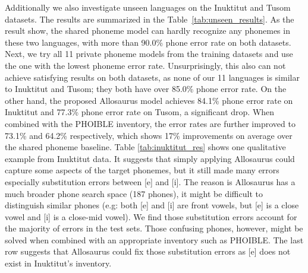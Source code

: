 \documentclass{article}
\newcommand{\gn}[1]{\textcolor{magenta}{\small [#1 --GN]}}
\newcommand{\xj}[1]{\textcolor{blue}{\small [#1 ---XJ]}}
\begin{document}
Additionally we also investigate unseen languages on the Inuktitut and Tusom datasets. The results are summarized in the Table~\ref{tab:unseen_results}. As the result show, the shared phoneme model can hardly recognize any phonemes in these two languages, with more than 90.0\% phone error rate on both datasets.
Next, we try all 11 private phoneme models from the training datasets and use the one with the lowest phoneme error rate. %
Unsurprisingly, this also can not achieve satisfying results on both datasets, as none of our 11 languages is similar to Inuktitut and Tusom; they both have over 85.0\% phone error rate.
On the other hand, the proposed Allosaurus model achieves 84.1\% phone error rate on Inuktitut and 77.3\% phone error rate on Tusom, a significant drop.
When combined with the PHOIBLE inventory, the error rates are further improved to 73.1\% and 64.2\% respectively, which shows 17\% improvements on average over the shared phoneme baseline. Table \ref{tab:inuktitut_res} shows one qualitative example from Inuktitut data. It suggests that simply applying Allosaurus could capture some aspects of the target phonemes, but it still made many errors especially substitution errors between [e] and [i]. The reason is Allosaurus has a much broader phone search space (187 phones), it might be difficult to distinguish similar phones (e.g: both [e] and [i] are front vowels, but [e] is a close vowel and [i] is a close-mid vowel). We find those substitution errors account for the majority of errors in the test sets. Those confusing phones, however, might be solved when combined with an appropriate inventory such as PHOIBLE. The last row suggests that Allosaurus could fix those substitution errors as [e] does not exist in Inuktitut's inventory. %

\end{document}
